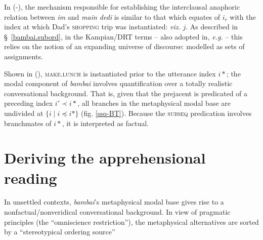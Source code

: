 \xe


\noindent In (-), the mechanism responsible for establishing the interclausal anaphoric relation between \textit{im} and \textit{main dedi} is similar to that which equates of $ i_r $ with the index at which Dad's \textsc{shopping} trip was instantiated: \textit{viz.} $ j $. As described in \S~\ref{bambai.subord}, in the Kampian/DRT terms \citep[\textit{e.g.},][Ch. 5]{Kamp1993} -- also adopted in, \textit{e.g.} \citealp{Partee} -- this relies on the notion of an expanding universe of discourse: modelled as sets of assignments.


Shown in (), \textsc{make.lunch} is instantiated prior to the utterance index $ i* $; the modal component of \textit{bambai} involves quantification over a totally realistic conversational background. That is, given that the prejacent is predicated of a preceding index $ i'\prec i* $, all branches in the metaphysical modal base are undivided at $ \{i\mid i\preccurlyeq i*\} $ (fig. \ref{ssq-BT}). Because the \textsc{subseq} predication involves branchmates of $ i* $, it is interpreted as factual.


\section{Deriving the apprehensional reading}

In unsettled contexts, \textit{bambai}'s metaphysical modal base gives rise to a nonfactual\slash{}non\-veri\-dical conversational background. In view of pragmatic principles (the ``omniscience restriction''), the metaphysical alternatives are sorted by a ``stereotypical ordering source'' \citetext{\citealp[\textit{e.g.},][37\textit{ff}]{Kratzer2012} \textit{i.a.}.} 







